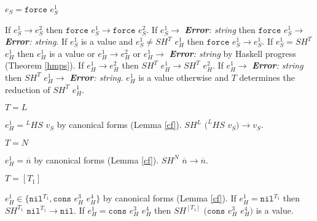 \begin{case}

$e_{S}=\mathtt{force}$ $e_{S}^{1}$

If $e_{S}^{1}\rightarrow e_{S}^{2}$ then $\mathtt{force}$ $e_{S}^{1}\rightarrow\mathtt{force}$ $e_{S}^{2}$.  If $e_{S}^{1}\rightarrow$ \emph{\textbf{Error}: string} then $\mathtt{force}$ $e_{S}^{1}\rightarrow$ \emph{\textbf{Error}: string}.  If $e_{S}^{1}$ is a value and $e_{S}^{1}\neq SH^{T}$ $e_{H}^{1}$ then $\mathtt{force}$ $e_{S}^{1}\rightarrow e_{S}^{1}$.  If $e_{S}^{1}=SH^{T}$ $e_{H}^{1}$ then $e_{H}^{1}$ is a value or $e_{H}^{1}\rightarrow e_{H}^{2}$ or $e_{H}^{1}\rightarrow$ \emph{\textbf{Error}: string} by Haskell progress (Theorem \ref{hmps}).  If $e_{H}^{1}\rightarrow e_{H}^{2}$ then $SH^{T}$ $e_{H}^{1}\rightarrow SH^{T}$ $e_{H}^{2}$.  If $e_{H}^{1}\rightarrow$ \emph{\textbf{Error}: string} then $SH^{T}$ $e_{H}^{1}\rightarrow$ \emph{\textbf{Error}: string}.  $e_{H}^{1}$ is a value otherwise and $T$ determines the reduction of $SH^{T}$ $e_{H}^{1}$.

\begin{subcase}

$T=L$

$e_{H}^{1}={^{L}H}S$ $v_{S}$ by canonical forms (Lemma \ref{cf}).  $SH^{L}$ $(^{L}HS$ $v_{S})\rightarrow v_{S}$.

\end{subcase}

\begin{subcase}

$T=N$

$e_{H}^{1}=\overline{n}$ by canonical forms (Lemma \ref{cf}).  $SH^{N}$ $\overline{n}\rightarrow\overline{n}$.

\end{subcase}

\begin{subcase}

$T=[T_{1}]$

$e_{H}^{1}\in\lbrace\mathtt{nil}^{T_{1}},\mathtt{cons}$ $e_{H}^{3}$ $e_{H}^{4}\rbrace$ by canonical forms (Lemma \ref{cf}).  If $e_{H}^{1}=\mathtt{nil}^{T_{1}}$ then $SH^{T_{1}}$ $\mathtt{nil}^{T_{1}}\rightarrow\mathtt{nil}$.  If $e_{H}^{1}=\mathtt{cons}$ $e_{H}^{3}$ $e_{H}^{4}$ then $SH^{[T_{1}]}$ $(\mathtt{cons}$ $e_{H}^{3}$ $e_{H}^{4})$ is a value.

\end{subcase}

\begin{subcase}


\end{subcase}
\end{case}
